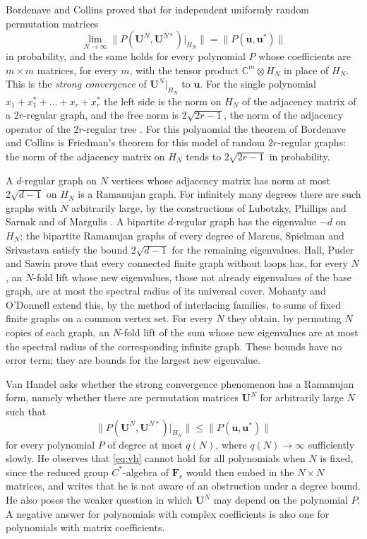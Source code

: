 \documentclass[11pt]{article}
\theoremstyle{remark}
\begin{document}
Bordenave and Collins \cite{BC} proved that for independent uniformly random permutation matrices
\[
  \lim_{N\to\infty}\bigl\|P(\mathbf U^N,\mathbf U^{N*})|_{H_N}\bigr\|=\|P(\mathbf u,\mathbf u^*)\|
\]
in probability, and the same holds for every polynomial $P$ whose coefficients are $m\times m$ matrices, for every
$m$, with the tensor product $\mathbb C^m\otimes H_N$ in place of $H_N$. This is the \emph{strong convergence} of
$\mathbf U^N|_{H_N}$ to $\mathbf u$. For the single polynomial $x_1+x_1^*+\dots+x_r+x_r^*$ the left side is the
norm on $H_N$ of the adjacency matrix of a $2r$-regular graph, and the free norm is $2\sqrt{2r-1}$, the norm of the
adjacency operator of the $2r$-regular tree \cite{Ke}. For this polynomial the theorem of Bordenave and Collins is Friedman's
theorem \cite{Fr} for this model of random $2r$-regular graphs: the norm of the adjacency matrix on $H_N$ tends to
$2\sqrt{2r-1}$ in probability.

A $d$-regular graph on $N$ vertices whose adjacency matrix has norm at most $2\sqrt{d-1}$ on $H_N$ is a Ramanujan
graph. For infinitely many degrees there are such graphs with $N$ arbitrarily large, by the constructions of Lubotzky, Phillips and Sarnak
\cite{LPS} and of Margulis \cite{Ma}. A bipartite $d$-regular graph has the eigenvalue $-d$ on $H_N$; the bipartite
Ramanujan graphs of every degree of Marcus, Spielman and Srivastava \cite{MSS} satisfy the bound $2\sqrt{d-1}$ for
the remaining eigenvalues. Hall, Puder and Sawin \cite{HPS} prove that every connected finite graph without loops
has, for every $N$, an $N$-fold lift whose new eigenvalues, those not already eigenvalues of the base graph, are at
most the spectral radius of its universal cover. Mohanty and O'Donnell \cite[Theorem~8.1]{MO} extend this, by the
method of interlacing families, to sums of fixed finite graphs on a common vertex set. For every $N$ they obtain, by
permuting $N$ copies of each graph, an $N$-fold lift of the sum whose new eigenvalues are at most the spectral radius
of the corresponding infinite graph. These bounds have no error term; they are bounds for the largest new
eigenvalue.

Van Handel \cite[Section~6.5]{vH} asks whether the strong convergence phenomenon has a Ramanujan form, namely
whether there are permutation matrices $\mathbf U^N$ for arbitrarily large $N$ such that
\begin{equation}\label{eq:vh}
  \bigl\|P(\mathbf U^N,\mathbf U^{N*})|_{H_N}\bigr\|\le\|P(\mathbf u,\mathbf u^*)\|
\end{equation}
for every polynomial $P$ of degree at most $q(N)$, where $q(N)\to\infty$ sufficiently slowly. He observes that
\eqref{eq:vh} cannot hold for all polynomials when $N$ is fixed, since the reduced group $C^*$-algebra of
$\mathbf F_r$ would then embed in the $N\times N$ matrices, and writes that he is not aware of an obstruction under a
degree bound. He also poses the weaker question in which $\mathbf U^N$ may depend on the polynomial $P$. A
negative answer for polynomials with complex coefficients is also one for polynomials with matrix
coefficients.
\end{document}
